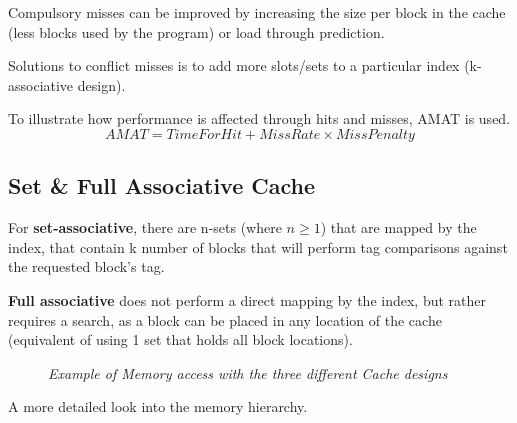 \documentclass[11pt]{article}
\begin{document}
Compulsory misses can be improved by increasing the size per block in the cache (less blocks used by the program) or load through prediction.

Solutions to conflict misses is to add more slots/sets to a particular index (k-associative design).

To illustrate how performance is affected through hits and misses, AMAT is used.
\vspace{-1em}
$$AMAT = TimeForHit + MissRate \times MissPenalty$$

\subsection*{Set \& Full Associative Cache}

For \textbf{set-associative}, there are n-sets (where $n\ge 1$) that are mapped by the index, that contain k number of blocks that will perform tag comparisons against the requested block's tag.

\textbf{Full associative} does not perform a direct mapping by the index, but rather requires a search, as a block can be placed in any location of the cache (equivalent of using 1 set that holds all block locations).

\begin{figure}[htbp]
    \centering
    \caption{\textit{Example of Memory access with the three different Cache designs}}
\end{figure}

A more detailed look into the memory hierarchy.
\end{document}
